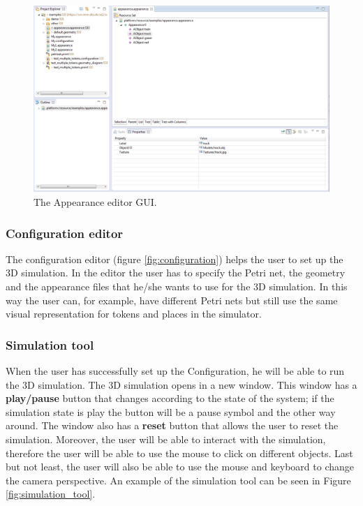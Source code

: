 \begin{figure}[ht]
\begin{center}
\includegraphics[scale=0.45]{image/ui/appearance.png}
\caption{The Appearance editor GUI.}
\label{fig:appearance_editor}
\end{center}
\end{figure}

\subsubsection{Configuration editor}
The configuration editor (figure \ref{fig:configuration}) helps the user to set up the 3D simulation. In the editor the user has to specify the Petri net, the geometry and the appearance files that he/she wants to use for the 3D simulation. In this way the user can, for example, have different Petri nets but still use the same visual representation for tokens and places in the simulator.

\subsubsection{Simulation tool}
When the user has successfully set up the Configuration, he will be able to run the 3D simulation. The 3D simulation opens in a new window. This window has a \textbf{play/pause} button that changes according to the state of the system; if the simulation state is play the button will be a pause symbol and the other way around. The window also has a \textbf{reset} button that allows the user to reset the simulation.
Moreover, the user will be able to interact with the simulation, therefore the user will be able to use the mouse to click on different objects. Last but not least, the user will also be able to use the mouse and keyboard to change the camera perspective. An example of the simulation tool can be seen in Figure \ref{fig:simulation_tool}.

